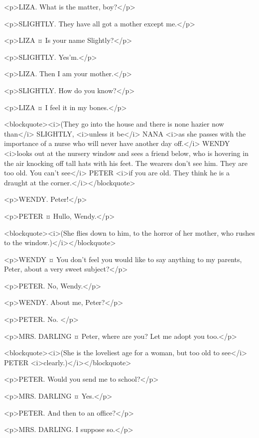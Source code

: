 <p>LIZA. What is the matter, boy?</p>

<p>SLIGHTLY. They have all got a mother except me.</p>

<p>LIZA ¤
Is your name Slightly?</p>

<p>SLIGHTLY. Yes'm.</p>

<p>LIZA. Then I am your mother.</p>

<p>SLIGHTLY. How do you know?</p>

<p>LIZA ¤
I feel it in my bones.</p>

<blockquote><i>(They go into the house and there is none hazier now than</i> SLIGHTLY, <i>unless it be</i> NANA <i>as she passes with the importance of a nurse who will never have another day off.</i> WENDY <i>looks out at the nursery window and sees a friend below, who is hovering in the air knocking off tall hats with his feet. The wearers don't see him. They are too old. You can't see</i> PETER <i>if you are old. They think he is a draught at the corner.</i></blockquote>

<p>WENDY. Peter!</p>

<p>PETER ¤
Hullo, Wendy.</p>

<blockquote><i>(She flies down to him, to the horror of her mother, who rushes to the window.)</i></blockquote>

<p>WENDY ¤
You don't feel you would like to say anything to my parents, Peter, about a very sweet subject?</p>

<p>PETER. No, Wendy.</p>

<p>WENDY. About me, Peter?</p>

<p>PETER. No.
</p>

<p>MRS. DARLING ¤
Peter, where are you? Let me adopt you too.</p>

<blockquote><i>(She is the loveliest age for a woman, but too old to see</i> PETER <i>clearly.)</i></blockquote>

<p>PETER. Would you send me to school?</p>

<p>MRS. DARLING ¤
Yes.</p>

<p>PETER. And then to an office?</p>

<p>MRS. DARLING. I suppose so.</p>

